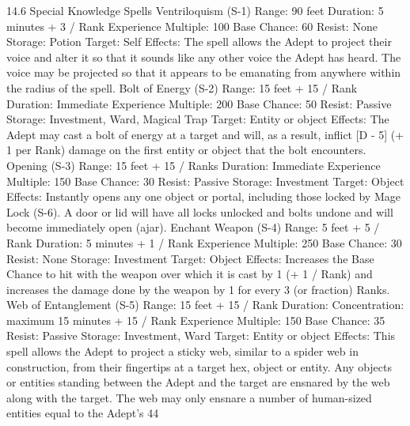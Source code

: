 \documentclass[a4paper]{article}
\begin{document}
\begin{multicols}{3}
14.6 Special Knowledge Spells
Ventriloquism (S-1)
Range: 90 feet
Duration: 5 minutes + 3 / Rank
Experience Multiple: 100
Base Chance: 60%
Resist: None
Storage: Potion
Target: Self
Effects: The spell allows the Adept to project their
voice and alter it so that it sounds like any other
voice the Adept has heard. The voice may be projected so that it appears to be emanating from
anywhere within the radius of the spell.
Bolt of Energy (S-2)
Range: 15 feet + 15 / Rank
Duration: Immediate
Experience Multiple: 200
Base Chance: 50%
Resist: Passive
Storage: Investment, Ward, Magical Trap
Target: Entity or object
Effects: The Adept may cast a bolt of energy at a
target and will, as a result, inflict [D - 5] (+ 1 per
Rank) damage on the first entity or object that the
bolt encounters.
Opening (S-3)
Range: 15 feet + 15 / Ranks
Duration: Immediate
Experience Multiple: 150
Base Chance: 30%
Resist: Passive
Storage: Investment
Target: Object
Effects: Instantly opens any one object or portal,
including those locked by Mage Lock (S-6). A
door or lid will have all locks unlocked and bolts
undone and will become immediately open (ajar).
Enchant Weapon (S-4)
Range: 5 feet + 5 / Rank
Duration: 5 minutes + 1 / Rank
Experience Multiple: 250
Base Chance: 30%
Resist: None
Storage: Investment
Target: Object
Effects: Increases the Base Chance to hit with the
weapon over which it is cast by 1 (+ 1 / Rank) and
increases the damage done by the weapon by 1 for
every 3 (or fraction) Ranks.
Web of Entanglement (S-5)
Range: 15 feet + 15 / Rank
Duration: Concentration: maximum 15 minutes +
15 / Rank
Experience Multiple: 150
Base Chance: 35%
Resist: Passive
Storage: Investment, Ward
Target: Entity or object
Effects: This spell allows the Adept to project a
sticky web, similar to a spider web in construction,
from their fingertips at a target hex, object or entity. Any objects or entities standing between the
Adept and the target are ensnared by the web along
with the target. The web may only ensnare a number of human-sized entities equal to the Adept’s
44


\end{multicols}
\end{document}
